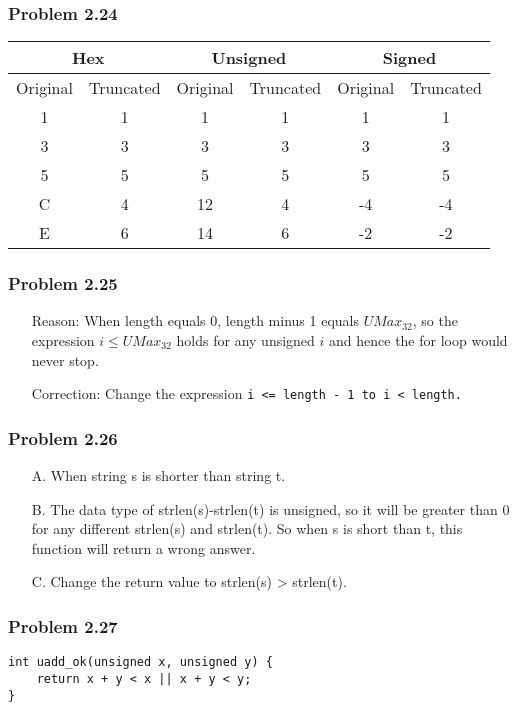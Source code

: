 \documentclass[a4paper]{article}
\begin{document}
\subsubsection*{Problem 2.24}
\begin{tabular}{cc|cc|cc}
    \multicolumn{2}{c|}{Hex}&\multicolumn{2}{|c|}{Unsigned}&\multicolumn{2}{|c}{Signed}\\
    \hline
    Original&Truncated&Original&Truncated&Original&Truncated\\
    \hline
    1&1&1&{1}&1&{1}\\
    3&3&3&{3}&3&{3}\\
    5&5&5&{5}&5&{5}\\
    C&4&12&{4}&-4&{-4}\\
    E&6&14&{6}&-2&{-2}
\end{tabular}

\subsubsection*{Problem 2.25}
\begin{enumerate}
\item []Reason: When length equals 0, length minus 1 equals $UMax_{32}$, so the expression $i \le UMax_{32}$ holds for any unsigned $i$ and hence the for loop would never stop.
\item []Correction: Change the expression \tt{i <= length - 1} \textrm{to} \tt{i < length}.
\end{enumerate}

\subsubsection*{Problem 2.26}
\begin{enumerate}
    \item [A.] When string s is shorter than string t.
    \item [B.] The data type of {strlen(s)-strlen(t)} is unsigned, so it will be greater than 0 for any different strlen(s) and strlen(t). So when s is short than t, this function will return a wrong answer.
    \item [C.] Change the return value to strlen(s) > strlen(t).
\end{enumerate}

\subsubsection*{Problem 2.27}
\begin{lstlisting}
int uadd_ok(unsigned x, unsigned y) {
    return x + y < x || x + y < y;
}
\end{lstlisting}
\end{document}
